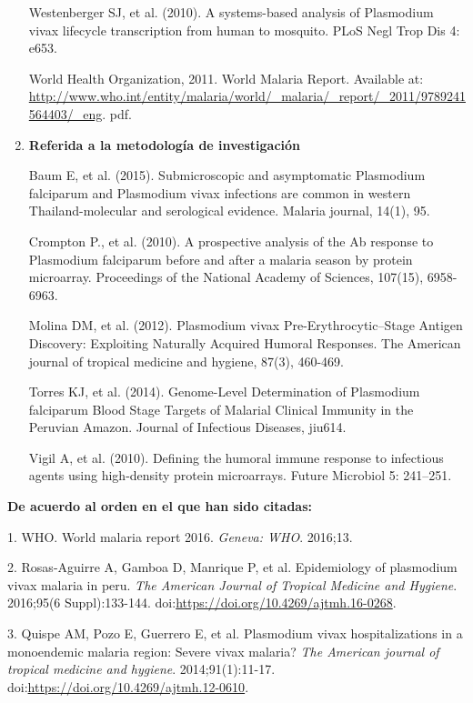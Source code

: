 \documentclass[]{article}
\begin{document}
\begin{enumerate}
  Westenberger SJ, et al. (2010). A systems-based analysis of Plasmodium
  vivax lifecycle transcription from human to mosquito. PLoS Negl Trop
  Dis 4: e653.

  World Health Organization, 2011. World Malaria Report. Available at:
  \url{http://www.who.int/entity/malaria/world/_malaria/_report/_2011/9789241564403/_eng}.
  pdf.
\item
  \textbf{Referida a la metodología de investigación}

  Baum E, et al. (2015). Submicroscopic and asymptomatic Plasmodium
  falciparum and Plasmodium vivax infections are common in western
  Thailand-molecular and serological evidence. Malaria journal, 14(1),
  95.

  Crompton P., et al. (2010). A prospective analysis of the Ab response
  to Plasmodium falciparum before and after a malaria season by protein
  microarray. Proceedings of the National Academy of Sciences, 107(15),
  6958-6963.

  Molina DM, et al. (2012). Plasmodium vivax Pre-Erythrocytic--Stage
  Antigen Discovery: Exploiting Naturally Acquired Humoral Responses.
  The American journal of tropical medicine and hygiene, 87(3), 460-469.

  Torres KJ, et al. (2014). Genome-Level Determination of Plasmodium
  falciparum Blood Stage Targets of Malarial Clinical Immunity in the
  Peruvian Amazon. Journal of Infectious Diseases, jiu614.

  Vigil A, et al. (2010). Defining the humoral immune response to
  infectious agents using high-density protein microarrays. Future
  Microbiol 5: 241--251.
\end{enumerate}

\textbf{De acuerdo al orden en el que han sido citadas:}

\hypertarget{refs}{}
\hypertarget{ref-WHO2016world}{}
1. WHO. World malaria report 2016. \emph{Geneva: WHO}. 2016;13.

\hypertarget{ref-rosas2016peru}{}
2. Rosas-Aguirre A, Gamboa D, Manrique P, et al. Epidemiology of
plasmodium vivax malaria in peru. \emph{The American Journal of Tropical
Medicine and Hygiene}. 2016;95(6 Suppl):133-144.
doi:\href{https://doi.org/https://doi.org/10.4269/ajtmh.16-0268}{https://doi.org/10.4269/ajtmh.16-0268}.

\hypertarget{ref-quispe2014}{}
3. Quispe AM, Pozo E, Guerrero E, et al. Plasmodium vivax
hospitalizations in a monoendemic malaria region: Severe vivax malaria?
\emph{The American journal of tropical medicine and hygiene}.
2014;91(1):11-17.
doi:\href{https://doi.org/https://doi.org/10.4269/ajtmh.12-0610}{https://doi.org/10.4269/ajtmh.12-0610}.
\end{document}
